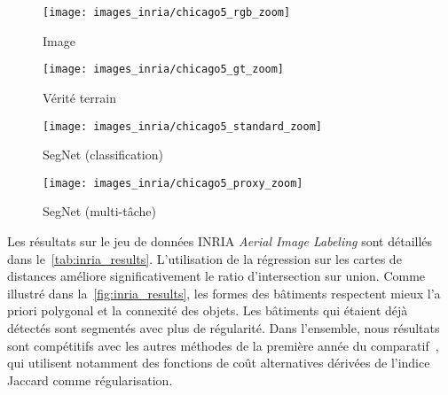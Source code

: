 \begin{figure*}[t]
\begin{subfigure}{0.24\textwidth}
	\texttt{[image: images\_inria/chicago5\_rgb\_zoom]}
    \caption{Image }
\end{subfigure}
\begin{subfigure}{0.24\textwidth}
	\texttt{[image: images\_inria/chicago5\_gt\_zoom]}
    \caption{Vérité terrain}
\end{subfigure}
\begin{subfigure}{0.24\textwidth}
	\texttt{[image: images\_inria/chicago5\_standard\_zoom]}
    \caption{SegNet (classification)}
\end{subfigure}
\begin{subfigure}{0.24\textwidth}
	\texttt{[image: images\_inria/chicago5\_proxy\_zoom]}
    \caption{SegNet (multi-tâche)}
\end{subfigure}
\caption[Extrait des résultats de segmentation sur le jeu de données INRIA \emph{Aerial Image Labeling}.]{Extrait des résultats de segmentation sur le jeu de données INRIA \emph{Aerial Image Labeling}. Les pixels corrects sont en \textcolor{OliveGreen}{vert}, les faux positifs en \textcolor{Lavender}{rose} et les faux négatifs en \textcolor{Blue}{bleu}. L'approche multi-tâche capture mieux la structure spatiale des objets.}
\label{fig:inria_results}
\end{figure*}

Les résultats sur le jeu de données INRIA \emph{Aerial Image Labeling} sont détaillés dans le~\cref{tab:inria_results}. L'utilisation de la régression sur les cartes de distances améliore significativement le ratio d'intersection sur union. Comme illustré dans la~\cref{fig:inria_results}, les formes des bâtiments respectent mieux l'a priori polygonal et la connexité des objets. Les bâtiments qui étaient déjà détectés sont segmentés avec plus de régularité. Dans l'ensemble, nous résultats sont compétitifs avec les autres méthodes de la première année du comparatif~\cite{huang_large-scale_2018}, qui utilisent notamment des fonctions de coût alternatives dérivées de l'indice Jaccard comme régularisation.

